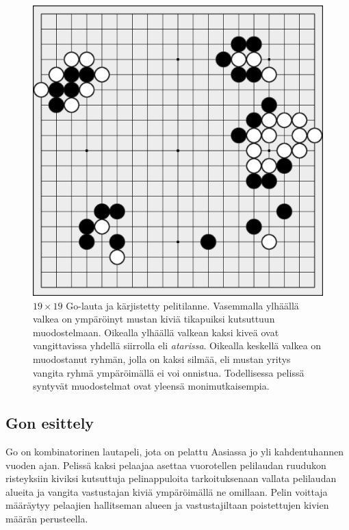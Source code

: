 \documentclass[12pt,finnish]{tktltiki2}
\theoremstyle{definition}
\theoremstyle{remark}
\begin{document}
\begin{figure}
\centering
\includegraphics[width = 0.8 \textwidth]{go_illustration.png}

\caption{$19 \times 19$ Go-lauta ja kärjistetty pelitilanne. Vasemmalla ylhäällä valkea on ympäröinyt mustan kiviä tikapuiksi kutsuttuun muodostelmaan. Oikealla ylhäällä valkean kaksi kiveä ovat vangittavissa yhdellä siirrolla eli \textit{atarissa}. Oikealla keskellä valkea on muodostanut ryhmän, jolla on kaksi silmää, eli mustan yritys vangita ryhmä ympäröimällä ei voi onnistua. Todellisessa pelissä syntyvät muodostelmat ovat yleensä monimutkaisempia.}
\end{figure}

\subsection{Gon esittely}

Go on kombinatorinen lautapeli, jota on pelattu Aasiassa jo yli kahdentuhannen vuoden ajan. Pelissä kaksi pelaajaa asettaa vuorotellen pelilaudan ruudukon risteyksiin kiviksi kutsuttuja pelinappuloita tarkoituksenaan vallata pelilaudan alueita ja vangita vastustajan kiviä ympäröimällä ne omillaan. Pelin voittaja määräytyy pelaajien hallitseman alueen ja vastustajiltaan poistettujen kivien määrän perusteella.
\end{document}

